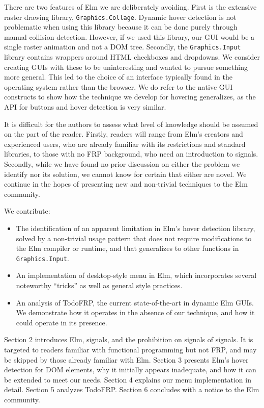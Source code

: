 \documentclass{article}
\begin{document}
There are two features of Elm we are deliberately avoiding. First is the
extensive raster drawing library, \texttt{Graphics.Collage}. Dynamic
hover detection is not problematic when using this library because it
can be done purely through manual collision detection. However, if we
used this library, our GUI would be a single raster animation and not a
DOM tree. Secondly, the \texttt{Graphics.Input} library contains
wrappers around HTML checkboxes and dropdowns. We consider creating GUIs
with these to be uninteresting and wanted to pursue something more
general. This led to the choice of an interface typically found in the
operating system rather than the browser. We do refer to the native GUI
constructs to show how the technique we develop for hovering
generalizes, as the API for buttons and hover detection is very similar.

It is difficult for the authors to assess what level of knowledge should
be assumed on the part of the reader. Firstly, readers will range from
Elm's creators and experienced users, who are already familiar with its
restrictions and standard libraries, to those with no FRP background,
who need an introduction to signals. Secondly, while we have found no
prior discussion on either the problem we identify nor its solution, we
cannot know for certain that either are novel. We continue in the hopes
of presenting new and non-trivial techniques to the Elm community.

We contribute:

\begin{itemize}
\itemsep1pt\parskip0pt
\item
  The identification of an apparent limitation in Elm's hover detection
  library, solved by a non-trivial usage pattern that does not require
  modifications to the Elm compiler or runtime, and that generalizes to
  other functions in \texttt{Graphics.Input}.
\item
  An implementation of desktop-style menu in Elm, which incorporates
  several noteworthy ``tricks'' as well as general style practices.
\item
  An analysis of TodoFRP, the current state-of-the-art in dynamic Elm
  GUIs. We demonstrate how it operates in the absence of our technique,
  and how it could operate in its presence.
\end{itemize}

Section 2 introduces Elm, signals, and the prohibition on signals of signals. It
is targeted to readers familiar with functional programming but not FRP, and may
be skipped by those already familiar with Elm. Section 3 presents Elm's hover
detection for DOM elements, why it initially appears inadequate, and how it can
be extended to meet our needs. Section 4 explains our menu implementation in
detail. Section 5 analyzes TodoFRP. Section 6 concludes with a notice to the Elm
community.
\end{document}
